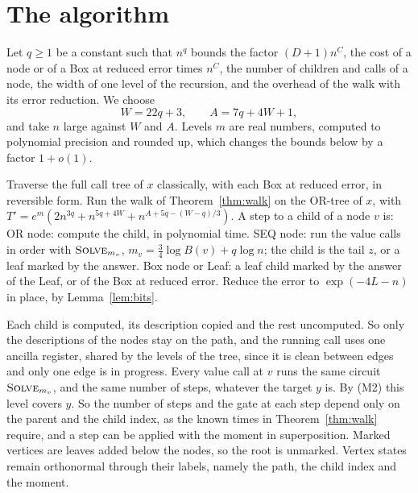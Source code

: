 \documentclass[11pt]{article}
\theoremstyle{definition}
\theoremstyle{remark}
\newcommand{\Solve}{\textsc{Solve}}
\begin{document}
\section{The algorithm}\label{sec:alg}

Let $q\ge1$ be a constant such that $n^q$ bounds the factor $(D+1)n^C$, the cost of a node or of a Box at reduced error times $n^C$, the number of children and calls of a node, the width of one level of the recursion, and the overhead of the walk with its error reduction. We choose
\[
W=22q+3,\qquad A=7q+4W+1,
\]
and take $n$ large against $W$ and $A$. Levels $m$ are real numbers, computed to polynomial precision and rounded up, which changes the bounds below by a factor $1+o(1)$.

\begin{algorithm}[h]
\caption{$\Solve_m(x)$, for an input or value-call target $x$ with $\log B(x)\le m$}
\label{alg:solve}
\begin{algorithmic}[1]
  \State Traverse the full call tree of $x$ classically, with each Box at reduced error, in reversible form.
\Else
  \State Run the walk of Theorem~\ref{thm:walk} on the OR-tree of $x$, with $T'=e^m(2n^{3q}+n^{5q+4W}+n^{A+5q-(W-q)/3})$. A step to a child of a node $v$ is:
  \Statex \hspace{2.5em} OR node: compute the child, in polynomial time.
  \Statex \hspace{2.5em} SEQ node: run the value calls in order with $\Solve_{m_v}$, $m_v=\frac34\log B(v)+q\log n$; the child is
  \Statex \hspace{2.5em} the tail $z$, or a leaf marked by the answer.
  \Statex \hspace{2.5em} Box node or Leaf: a leaf child marked by the answer of the Leaf, or of the Box at reduced error.
  \State Reduce the error to $\exp(-4L-n)$ in place, by Lemma~\ref{lem:bits}.
\EndIf
\end{algorithmic}
\end{algorithm}

Each child is computed, its description copied and the rest uncomputed. So only the descriptions of the nodes stay on the path, and the running call uses one ancilla register, shared by the levels of the tree, since it is clean between edges and only one edge is in progress. Every value call at $v$ runs the same circuit $\Solve_{m_v}$, and the same number of steps, whatever the target $y$ is. By (M2) this level covers $y$. So the number of steps and the gate at each step depend only on the parent and the child index, as the known times in Theorem~\ref{thm:walk} require, and a step can be applied with the moment in superposition. Marked vertices are leaves added below the nodes, so the root is unmarked. Vertex states remain orthonormal through their labels, namely the path, the child index and the moment.
\end{document}
